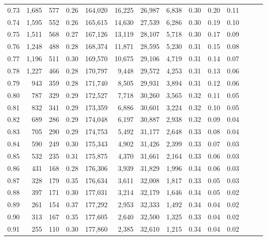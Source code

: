\begin{tabular}{rrrrrrrrrrrrrr}
0.73 &  1,685 &  577 &  0.26 &  164,020 &   16,225 &  26,987 &   6,838 &  0.30 &  0.20 &      0.11 \\
0.74 &  1,595 &  552 &  0.26 &  165,615 &   14,630 &  27,539 &   6,286 &  0.30 &  0.19 &      0.10 \\
0.75 &  1,511 &  568 &  0.27 &  167,126 &   13,119 &  28,107 &   5,718 &  0.30 &  0.17 &      0.09 \\
0.76 &  1,248 &  488 &  0.28 &  168,374 &   11,871 &  28,595 &   5,230 &  0.31 &  0.15 &      0.08 \\
0.77 &  1,196 &  511 &  0.30 &  169,570 &   10,675 &  29,106 &   4,719 &  0.31 &  0.14 &      0.07 \\
0.78 &  1,227 &  466 &  0.28 &  170,797 &    9,448 &  29,572 &   4,253 &  0.31 &  0.13 &      0.06 \\
0.79 &    943 &  359 &  0.28 &  171,740 &    8,505 &  29,931 &   3,894 &  0.31 &  0.12 &      0.06 \\
0.80 &    787 &  329 &  0.29 &  172,527 &    7,718 &  30,260 &   3,565 &  0.32 &  0.11 &      0.05 \\
0.81 &    832 &  341 &  0.29 &  173,359 &    6,886 &  30,601 &   3,224 &  0.32 &  0.10 &      0.05 \\
0.82 &    689 &  286 &  0.29 &  174,048 &    6,197 &  30,887 &   2,938 &  0.32 &  0.09 &      0.04 \\
0.83 &    705 &  290 &  0.29 &  174,753 &    5,492 &  31,177 &   2,648 &  0.33 &  0.08 &      0.04 \\
0.84 &    590 &  249 &  0.30 &  175,343 &    4,902 &  31,426 &   2,399 &  0.33 &  0.07 &      0.03 \\
0.85 &    532 &  235 &  0.31 &  175,875 &    4,370 &  31,661 &   2,164 &  0.33 &  0.06 &      0.03 \\
0.86 &    431 &  168 &  0.28 &  176,306 &    3,939 &  31,829 &   1,996 &  0.34 &  0.06 &      0.03 \\
0.87 &    328 &  179 &  0.35 &  176,634 &    3,611 &  32,008 &   1,817 &  0.33 &  0.05 &      0.03 \\
0.88 &    397 &  171 &  0.30 &  177,031 &    3,214 &  32,179 &   1,646 &  0.34 &  0.05 &      0.02 \\
0.89 &    261 &  154 &  0.37 &  177,292 &    2,953 &  32,333 &   1,492 &  0.34 &  0.04 &      0.02 \\
0.90 &    313 &  167 &  0.35 &  177,605 &    2,640 &  32,500 &   1,325 &  0.33 &  0.04 &      0.02 \\
0.91 &    255 &  110 &  0.30 &  177,860 &    2,385 &  32,610 &   1,215 &  0.34 &  0.04 &      0.02 \\

\end{tabular}
